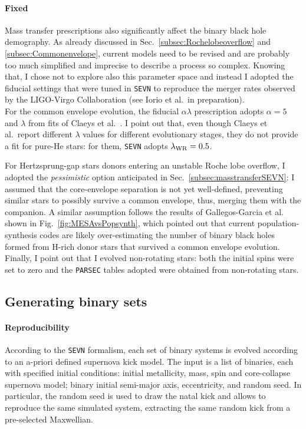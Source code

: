 \documentclass[a4paper,titlepage]{book}     	%
\begin{document}
\paragraph{Fixed}
Mass transfer prescriptions also significantly affect the binary black hole demography. As already discussed in Sec.\ \ref{subsec:Rochelobeoverflow} and \ref{subsec:Commonenvelope}, current models need to be revised and are probably too much simplified and imprecise to describe a process so complex. Knowing that, I chose not to explore also this parameter space and instead I adopted the fiducial settings that were tuned in \texttt{SEVN} to reproduce the merger rates observed by the LIGO-Virgo Collaboration (see Iorio et al.\ in preparation). \\

For the common envelope evolution, the fiducial $\alpha \lambda$ prescription adopts $\alpha=5$ and $\lambda$ from fits of Claeys et al.\ \cite{Clayes2014_lambdaCE}. I point out that, even though Claeys et al.\ report different $\lambda$ values for different evolutionary stages, they do not provide a fit for pure-He stars: for them, \texttt{SEVN} adopts $\lambda_{\rm WR} = 0.5$.

For Hertzsprung-gap stars donors entering an unstable Roche lobe overflow, I adopted the \emph{pessimistic} option anticipated in Sec.\ \ref{subsec:masstransferSEVN}: I assumed that the core-envelope separation is not yet well-defined, preventing similar stars to possibly survive a common envelope, thus, merging them with the companion. A similar assumption follows the results of Gallegos-Garcia et al.\ \cite{gallegos2021MESAvspopsynth} shown in Fig.\ \ref{fig:MESAvsPopsynth}, which pointed out that current population-synthesis codes are likely over-estimating the number of binary black holes formed from H-rich donor stars that survived a common envelope evolution.\\

Finally, I point out that I evolved non-rotating stars: both the initial spins were set to zero and the \texttt{PARSEC} tables adopted were obtained from non-rotating stars.



\subsection{Generating binary sets}\label{subsec:setgeneration}
\paragraph{Reproducibility} According to the \texttt{SEVN} formalism, each set of binary systems is evolved according to an a-priori defined supernova kick model. The input is a list of binaries, each with specified initial conditions:  initial metallicity, mass, spin and core-collapse supernova model; binary initial semi-major axis, eccentricity, and random seed. In particular, the  random seed is used to draw the natal kick and allows to reproduce  the same simulated system, extracting the same random kick from a pre-selected Maxwellian. 
\end{document}
